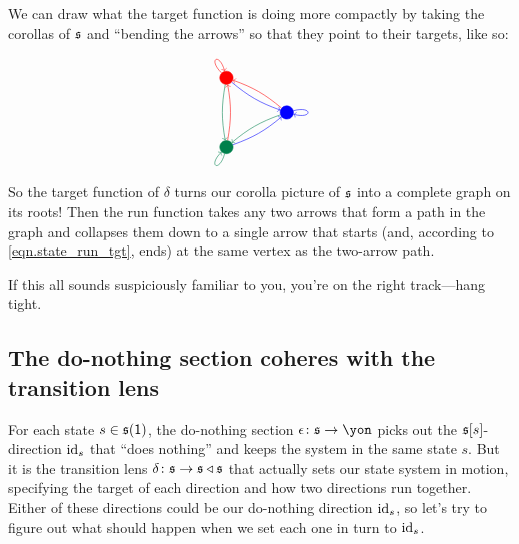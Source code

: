 \documentclass[Book-Poly]{subfiles}
\begin{document}
\begin{example}
We can draw what the target function is doing more compactly by taking the corollas of $\mathfrak{s}$ and ``bending the arrows'' so that they point to their targets, like so:
\[
\begin{tikzpicture}
    \node[circle,minimum size=2cm] (b) {};
    \foreach\x/\c in {1/red, 2/dgreen, 3/blue} {
        \node[minimum size=0.1cm,draw,circle,\c,fill=\c] (3-\x) at (b.{360/3*\x}){};
    }
    \foreach\x/\c in {1/red, 2/dgreen, 3/blue} {
        \foreach\y/\d in {1/red, 2/dgreen, 3/blue}{
            \ifnum\x=\y
                \draw[\d,->] (3-\x) to [in=360/3*\x-15,out=360/3*\x+15,loop] ();
                \relax
            \else
                \draw[\d] (3-\x) edge[->,bend right=10] (3-\y);
            \fi
        }
    }
\end{tikzpicture}
\]
So the target function of $\delta$ turns our corolla picture of $\mathfrak{s}$ into a complete graph on its roots!
Then the run function takes any two arrows that form a path in the graph and collapses them down to a single arrow that starts (and, according to \eqref{eqn.state_run_tgt}, ends) at the same vertex as the two-arrow path.

If this all sounds suspiciously familiar to you, you're on the right track---hang tight.
\end{example}

\subsection{The do-nothing section coheres with the transition lens}\label{subsec.comon.sharp.state.cohere}

For each state $s\in\mathfrak{s}(\textsf{1})$, the do-nothing section $\epsilon\colon\car{s}\to\yon$ picks out the $\mathfrak{s}[s]$-direction $\mathrm{id}_s$ that ``does nothing'' and keeps the system in the same state $s$.
But it is the transition lens $\delta\colon\mathfrak{s}\to\mathfrak{s}\mathbin{\triangleleft}\mathfrak{s}$ that actually sets our state system in motion, specifying the target of each direction and how two directions run together.
Either of these directions could be our do-nothing direction $\mathrm{id}_s$, so let's try to figure out what should happen when we set each one in turn to $\mathrm{id}_s$.
\end{document}
